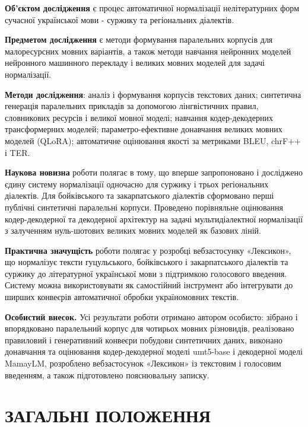 \documentclass[14pt]{extarticle}
\begin{document}
\textbf{Об'єктом дослідження} є процес автоматичної нормалізації нелітературних форм сучасної української мови - суржику та регіональних діалектів.

\textbf{Предметом дослідження} є методи формування паралельних корпусів для малоресурсних мовних варіантів, а також методи навчання нейронних моделей нейронного машинного перекладу і великих мовних моделей для задачі нормалізації.

\textbf{Методи дослідження}: аналіз і формування корпусів текстових даних; синтетична генерація паралельних прикладів за допомогою лінгвістичних правил, словникових ресурсів і великої мовної моделі; навчання кодер-декодерних трансформерних моделей; параметро-ефективне донавчання великих мовних моделей (QLoRA); автоматичне оцінювання якості за метриками BLEU, chrF++ і TER.

\textbf{Наукова новизна} роботи полягає в тому, що вперше запропоновано і досліджено єдину систему нормалізації одночасно для суржику і трьох регіональних діалектів. Для бойківського та закарпатського діалектів сформовано перші публічні синтетичні паралельні корпуси. Проведено порівняльне оцінювання кодер-декодерної та декодерної архітектур на задачі мультидіалектної нормалізації з залученням нуль-шотових великих мовних моделей як базових ліній.

\textbf{Практична значущість} роботи полягає у розробці вебзастосунку «Лексикон», що нормалізує тексти гуцульського, бойківського і закарпатського діалектів та суржику до літературної української мови з підтримкою голосового введення. Систему можна використовувати як самостійний інструмент або інтегрувати до ширших конвеєрів автоматичної обробки україномовних текстів.

\textbf{Особистий внесок.} Усі результати роботи отримано автором особисто: зібрано і впорядковано паралельний корпус для чотирьох мовних різновидів, реалізовано правиловий і генеративний конвеєри побудови синтетичних даних, виконано донавчання та оцінювання кодер-декодерної моделі umt5-base і декодерної моделі MamayLM, розроблено вебзастосунок «Лексикон» із текстовим і голосовим введенням, а також підготовлено пояснювальну записку.

\clearpage

\section{ЗАГАЛЬНІ ПОЛОЖЕННЯ}
\end{document}
